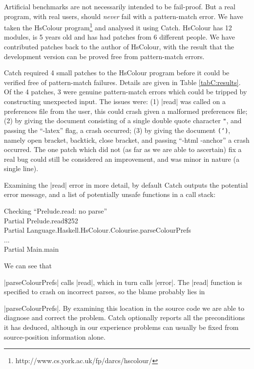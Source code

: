 Artificial benchmarks are not necessarily intended to be fail-proof. But a real program, with real users, should \textit{never} fail with a pattern-match error. We have taken the HsColour program\footnote{http://www.cs.york.ac.uk/fp/darcs/hscolour/} and analysed it using Catch. HsColour has 12 modules, is 5 years old and has had patches from 6 different people.
We have contributed patches back to the author of HsColour, with the result that the development version can be proved free from pattern-match errors.

Catch required 4 small patches to the HsColour program before it could be verified free of pattern-match failures. Details are given in Table \ref{tabC:results}. Of the 4 patches, 3 were genuine pattern-match errors which could be tripped by constructing unexpected input. The issues were: (1) |read| was called on a preferences file from the user, this could crash given a malformed preferences file; (2) by giving the document consisting of a single double quote character \texttt{"}, and passing the ``-latex'' flag, a crash occurred; (3) by giving the document \texttt{(`)}, namely open bracket, backtick, close bracket, and passing ``-html -anchor'' a crash occurred. The one patch which did not (as far as we are able to ascertain) fix a real bug could still be considered an improvement, and was minor in nature (a single line).

Examining the |read| error in more detail, by default Catch outputs the potential error message, and a list of potentially unsafe functions in a call stack:

\begin{console}
Checking ``Prelude.read: no parse'' \\
Partial Prelude.read\$252 \\
Partial Language.Haskell.HsColour.Colourise.parseColourPrefs \\
... \\
Partial Main.main
\end{console}

We can see that \ignore|parseColourPrefs| calls |read|, which in turn calls |error|. The |read| function is specified to crash on incorrect parses, so the blame probably lies in \ignore|parseColourPrefs|. By examining this location in the source code we are able to diagnose and correct the problem. Catch optionally reports all the preconditions it has deduced, although in our experience problems can usually be fixed from source-position information alone.

